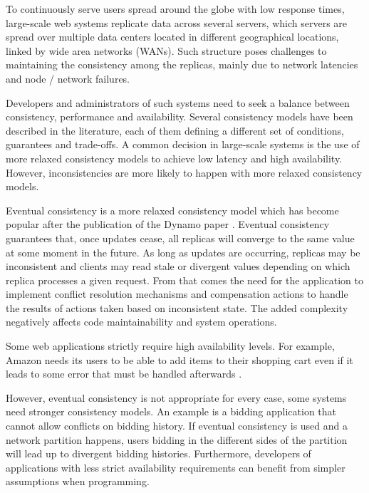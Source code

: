 \documentclass[doublespacing]{bmcart}
\begin{document}
To continuously serve users spread around the globe with low response times,
large-scale web systems replicate data across several servers, which servers are
spread over multiple data centers located in different geographical locations,
linked by wide area networks (WANs). Such structure poses challenges to
maintaining the consistency among the replicas, mainly due to network latencies
and node / network failures.

Developers and administrators of such systems need to seek a balance between
consistency, performance and availability. Several consistency models have been
described in the literature, each of them defining a different set of
conditions, guarantees and trade-offs. A common decision in large-scale systems
is the use of more relaxed consistency models to achieve low latency and high
availability.  However, inconsistencies are more likely to happen with more
relaxed consistency models.

Eventual consistency is a more relaxed consistency model which has become
popular after the publication of the Dynamo paper \cite{DeCandia2007}. Eventual
consistency guarantees that, once updates cease, all replicas will converge to
the same value at some moment in the future. As long as updates are occurring,
replicas may be inconsistent and clients may read stale or divergent values
depending on which replica processes a given request. From that comes the need
for the application to implement conflict resolution mechanisms and compensation
actions to handle the results of actions taken based on inconsistent state. The
added complexity negatively affects code maintainability and system operations.

Some web applications strictly require high availability levels. For example,
Amazon needs its users to be able to add items to their shopping cart even if it
leads to some error that must be handled afterwards \cite{DeCandia2007}.

However, eventual consistency is not appropriate for every case, some systems
need stronger consistency models. An example is a bidding application that
cannot allow conflicts on bidding history. If eventual consistency is used and a
network partition happens, users bidding in the different sides of the partition
will lead up to divergent bidding histories. Furthermore, developers of
applications with less strict availability requirements can benefit from simpler
assumptions when programming.
\end{document}
